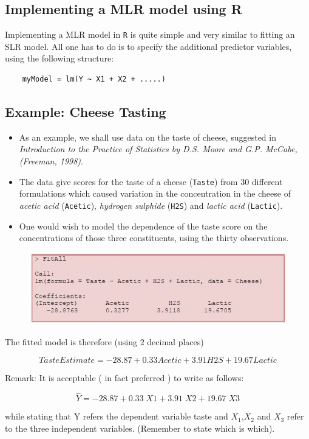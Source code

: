 \documentclass[a4paper,12pt]{article}
\begin{document}
\newpage
\subsection{Implementing a MLR model using R}
	Implementing a MLR model in \texttt{R} is quite simple and very similar to fitting an SLR model.
	All one has to do is to specify the additional predictor variables, using the following structure:
	\begin{framed}
	\begin{verbatim}
	myModel = lm(Y ~ X1 + X2 + .....)
	\end{verbatim}
	\end{framed}
	
\subsection{Example: Cheese Tasting}
\begin{itemize}
\item As an example, we shall use data on the taste of cheese, suggested in \textit{Introduction to the Practice of Statistics by D.S. Moore and G.P. McCabe, (Freeman, 1998)}.
	
\item The data give scores for the taste of a cheese (\texttt{Taste}) from 30 different formulations which caused variation in the concentration in the cheese of \textit{acetic acid }(\texttt{Acetic}), \textit{hydrogen sulphide} (\texttt{H2S}) and \textit{lactic acid} (\texttt{Lactic}).
\item One would wish to model the dependence of the taste score on the concentrations of those three constituents, using the thirty observations.
\end{itemize}


\begin{figure}[h!]
\centering
\includegraphics[width=0.9\linewidth]{images/MLR-CheeseRegressionModel}

\end{figure}



The fitted model is therefore (using 2 decimal places)
\begin{framed}
	\[  TasteEstimate = -28.87 + 0.33Acetic + 3.91H2S + 19.67Lactic \]
\end{framed}
Remark: It is acceptable ( in fact preferred ) to write as follows:
\begin{framed}
\[  \hat{Y} = -28.87 + 0.33\;X1 + 3.91\;X2 + 19.67\;X3 \]
\end{framed}
while stating that Y refers the dependent variable taste and $X_1$,$X_2$ and $X_3$ refer to the three independent variables. (Remember to state which is which).
\end{document}
